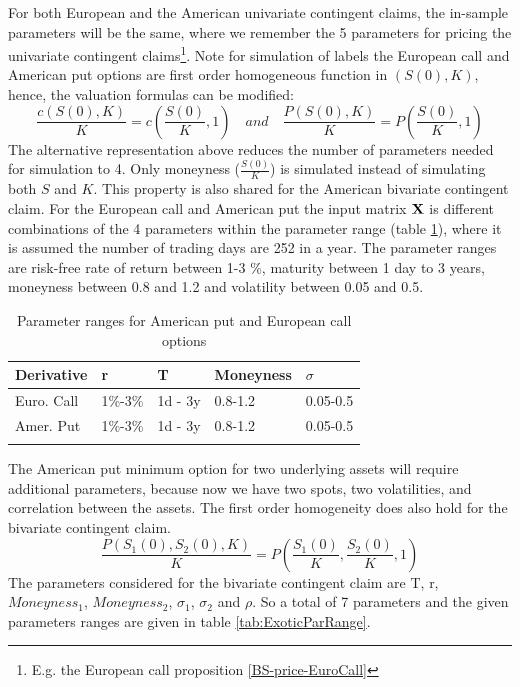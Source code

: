 For both European and the American univariate contingent claims, the in-sample parameters will be the same, where we remember the 5 parameters for pricing the  univariate contingent claims\footnote{E.g. the European call proposition \ref{BS-price-EuroCall}}. Note for simulation of labels the European call and American put options are first order homogeneous function in $(S(0),K)$, hence, the valuation formulas can be modified:
$$\frac{c(S(0),K)}{K}=c(\frac{S(0)}{K},1) \quad and \quad \frac{P(S(0),K)}{K}=P(\frac{S(0)}{K},1)$$
The alternative representation above reduces the number of parameters needed for simulation to 4. Only moneyness ($\frac{S(0)}{K}$) is simulated instead of simulating both $S$ and $K$. This property is also shared for the American bivariate contingent claim. For the European call and American put the input matrix $\mathbf{X}$ is different combinations of the 4 parameters within the parameter range (table \ref{tab:vanillaParRange}), where it is assumed the number of trading days are 252 in a year. The parameter ranges are risk-free rate of return between 1-3 \%, maturity between 1 day to 3 years, moneyness between 0.8 and 1.2 and volatility between 0.05 and 0.5. \\

\begin{table}[th]
\caption[Parameter Ranges In-sample for MLP on Univariate Contingent Claims]{Parameter ranges for American put and European call options}
\label{tab:vanillaParRange}
\centering
\begin{tabular}{l l l l l}
\toprule
\textbf{Derivative} & \textbf{r} & \textbf{T} & \textbf{Moneyness} & $\sigma$ \\
\midrule
Euro. Call & 1\%-3\% & 1d - 3y & 0.8-1.2 & 0.05-0.5\\ 
Amer. Put & 1\%-3\% & 1d - 3y & 0.8-1.2 & 0.05-0.5\\ 
\bottomrule\\
\end{tabular}
\end{table}

The American put minimum option for two underlying assets will require additional parameters, because now we have two spots, two volatilities, and correlation between the assets. The first order homogeneity does also hold for the bivariate contingent claim.
$$\frac{P(S_1(0),S_2(0),K)}{K}=P(\frac{S_1(0)}{K}, \frac{S_2(0)}{K},1)$$
The parameters considered for the bivariate contingent claim are T, r, $Moneyness_1$, $Moneyness_2$, $\sigma_1$, $\sigma_2$ and $\rho$. So a total of 7 parameters and the given parameters ranges are given in table \ref{tab:ExoticParRange}.\\
   
